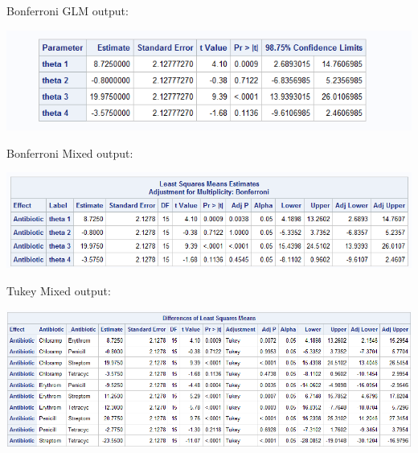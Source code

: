 \newpage

Bonferroni GLM output:
\begin{center}
\includegraphics[scale=0.8]{BindFracBon}
\end{center}
Bonferroni Mixed output:
\begin{center}
\includegraphics[scale=0.8]{BindFracBonMixed}
\end{center}

Tukey Mixed output:
\begin{center}
\includegraphics[scale=0.65]{BindFracTukeyMixed}
\end{center}

\newpage

